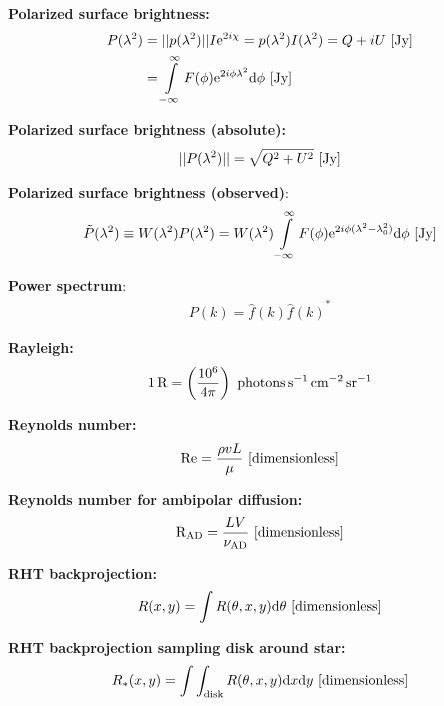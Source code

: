 \documentclass[a4paper,10pt]{article}
\begin{document}
{\noindent}\textbf{Polarized surface brightness:}
\begin{align*}
P(\lambda^2) &= \lvert\lvert p(\lambda^2) \rvert\rvert I\mathrm{e}^{2i\chi} = p(\lambda^2)I(\lambda^2) = Q+iU ~ [\rm Jy] \\
&= \int\limits_{-\infty}^\infty F(\phi)\mathrm{e}^{2i\phi\lambda^2}\mathrm{d}\phi ~ [\rm Jy]
\end{align*}

{\noindent}\textbf{Polarized surface brightness (absolute):}
\begin{align*}
\lvert\lvert P(\lambda^2) \rvert\rvert = \sqrt{Q^2+U^2} ~ [\rm Jy]
\end{align*}

{\noindent}\textbf{Polarized surface brightness (observed)}:
\begin{align*}
\tilde{P}(\lambda^2) \equiv W(\lambda^2)P(\lambda^2) = W(\lambda^2) \int\limits_{-\infty}^\infty F(\phi)\mathrm{e}^{2i\phi(\lambda^2-\lambda_0^2)}\mathrm{d}\phi ~ [\rm Jy]
\end{align*}

{\noindent}\textbf{Power spectrum}:
\begin{align*}
    P(k) = \hat{f}(k){\hat{f}(k)}^*
\end{align*}

{\noindent}\textbf{Rayleigh:}
\begin{align*}
    1\,{\rm R} = \left(\frac{10^6}{4\pi}\right) ~ {\rm photons\,s^{-1}\,cm^{-2}\,sr^{-1}}
\end{align*}

{\noindent}\textbf{Reynolds number:}
\begin{align*}
    {\rm Re} = \frac{\rho vL}{\mu} ~ [{\rm dimensionless}]
\end{align*}

{\noindent}\textbf{Reynolds number for ambipolar diffusion:}
\begin{align*}
    {\rm R}_\mathrm{\rm AD} = \dfrac{LV}{\nu_\mathrm{AD}} ~ [{\rm dimensionless}]
\end{align*}

{\noindent}\textbf{RHT backprojection:}
\begin{align*}
    R(x,y) = \int R(\theta,x,y)\mathrm{d}\theta ~ [{\rm dimensionless}]
\end{align*}

{\noindent}\textbf{RHT backprojection sampling disk around star:}
\begin{align*}
    R_*(x,y) = \int\int_\mathrm{disk} R(\theta,x,y)\mathrm{d}x\mathrm{d}y ~ [{\rm dimensionless}]
\end{align*}
\end{document}
